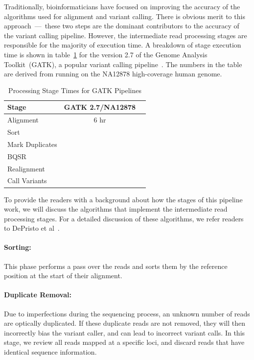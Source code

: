 \documentclass[10pt,twocolumn]{article}
\begin{document}
Traditionally, bioinformaticians have focused on improving the accuracy of the algorithms used for alignment and variant
calling. There is obvious merit to this approach~---~these two steps are the dominant contributors to the accuracy of the variant
calling pipeline. However, the intermediate read processing stages are responsible for the majority of execution time. A
breakdown of stage execution time is shown in table~\ref{tab:stage-time} for the version 2.7 of the Genome Analysis
Toolkit~(GATK), a popular variant calling pipeline~\cite{mckenna10}. The numbers in the table are derived from running on
the NA12878 high-coverage human genome.

\begin{table}[h]
\caption{Processing Stage Times for GATK Pipelines}
\label{tab:stage-time}
\begin{center}
\begin{tabular}{| l | c | c |}
\hline
\bf Stage & \bf GATK 2.7/NA12878 \\
\hline
Alignment & 6 hr \\
Sort & \\
Mark Duplicates & \\
BQSR & \\
Realignment & \\
Call Variants & \\
\hline
\end{tabular}
\end{center}
\end{table}

To provide the readers with a background about how the stages of this pipeline work, we will discuss the algorithms that
implement the intermediate read processing stages. For a detailed discussion of these algorithms, we refer readers to DePristo
et al~\cite{depristo11}.

\paragraph{Sorting:}
\label{sec:sorting}

This phase performs a pass over the reads and sorts them by the reference position at the start of their alignment.

\paragraph{Duplicate Removal:} 
\label{sec:duplicate-removal}

Due to imperfections during the sequencing process, an unknown number of reads are optically duplicated. If these duplicate
reads are not removed, they will then incorrectly bias the variant caller, and can lead to incorrect variant calls. In this stage, we
review all reads mapped at a specific loci, and discard reads that have identical sequence information.
\end{document}
